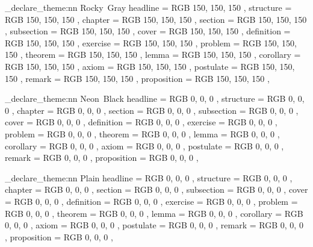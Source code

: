 \elegant_declare_theme:nn { Rocky~Gray }
  {
    headline     =   {RGB}{ 150, 150, 150 },
    structure    =   {RGB}{ 150, 150, 150 },
    chapter      =   {RGB}{ 150, 150, 150 },
    section      =   {RGB}{ 150, 150, 150 },
    subsection   =   {RGB}{ 150, 150, 150 },
    cover        =   {RGB}{ 150, 150, 150 },
    definition   =   {RGB}{ 150, 150, 150 },
    exercise     =   {RGB}{ 150, 150, 150 },
    problem      =   {RGB}{ 150, 150, 150 },
    theorem      =   {RGB}{ 150, 150, 150 },
    lemma        =   {RGB}{ 150, 150, 150 },
    corollary    =   {RGB}{ 150, 150, 150 },
    axiom        =   {RGB}{ 150, 150, 150 },
    postulate    =   {RGB}{ 150, 150, 150 },
    remark       =   {RGB}{ 150, 150, 150 },
    proposition  =   {RGB}{ 150, 150, 150 },
  }

\elegant_declare_theme:nn { Neon~Black }
  {
    headline     =   {RGB}{ 0,   0,   0   },
    structure    =   {RGB}{ 0,   0,   0   },
    chapter      =   {RGB}{ 0,   0,   0   },
    section      =   {RGB}{ 0,   0,   0   },
    subsection   =   {RGB}{ 0,   0,   0   },
    cover        =   {RGB}{ 0,   0,   0   },
    definition   =   {RGB}{ 0,   0,   0   },
    exercise     =   {RGB}{ 0,   0,   0   },
    problem      =   {RGB}{ 0,   0,   0   },
    theorem      =   {RGB}{ 0,   0,   0   },
    lemma        =   {RGB}{ 0,   0,   0   },
    corollary    =   {RGB}{ 0,   0,   0   },
    axiom        =   {RGB}{ 0,   0,   0   },
    postulate    =   {RGB}{ 0,   0,   0   },
    remark       =   {RGB}{ 0,   0,   0   },
    proposition  =   {RGB}{ 0,   0,   0   },
  }

\elegant_declare_theme:nn { Plain }
  {
    headline     =   {RGB}{ 0,   0,   0   },
    structure    =   {RGB}{ 0,   0,   0   },
    chapter      =   {RGB}{ 0,   0,   0   },
    section      =   {RGB}{ 0,   0,   0   },
    subsection   =   {RGB}{ 0,   0,   0   },
    cover        =   {RGB}{ 0,   0,   0   },
    definition   =   {RGB}{ 0,   0,   0   },
    exercise     =   {RGB}{ 0,   0,   0   },
    problem      =   {RGB}{ 0,   0,   0   },
    theorem      =   {RGB}{ 0,   0,   0   },
    lemma        =   {RGB}{ 0,   0,   0   },
    corollary    =   {RGB}{ 0,   0,   0   },
    axiom        =   {RGB}{ 0,   0,   0   },
    postulate    =   {RGB}{ 0,   0,   0   },
    remark       =   {RGB}{ 0,   0,   0   },
    proposition  =   {RGB}{ 0,   0,   0   },
  }

\endinput
